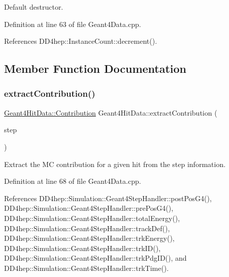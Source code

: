 Default destructor. 



Definition at line 63 of file Geant4\+Data.\+cpp.



References D\+D4hep\+::\+Instance\+Count\+::decrement().



\subsection{Member Function Documentation}
\hypertarget{class_d_d4hep_1_1_simulation_1_1_geant4_hit_data_aa05fcd729fd401c61e2fa7a48887efc5}{}\label{class_d_d4hep_1_1_simulation_1_1_geant4_hit_data_aa05fcd729fd401c61e2fa7a48887efc5} 
\subsubsection{\texorpdfstring{extract\+Contribution()}{extractContribution()}\hspace{0.1cm}{\footnotesize\ttfamily [1/2]}}
{\footnotesize\ttfamily \hyperlink{class_d_d4hep_1_1_simulation_1_1_geant4_hit_data_aec2f53237eac2db7d83dd03bca8719c5}{Geant4\+Hit\+Data\+::\+Contribution} Geant4\+Hit\+Data\+::extract\+Contribution (\begin{DoxyParamCaption}\item[{const G4\+Step $\ast$}]{step }\end{DoxyParamCaption})\hspace{0.3cm}{\ttfamily [static]}}



Extract the MC contribution for a given hit from the step information. 



Definition at line 68 of file Geant4\+Data.\+cpp.



References D\+D4hep\+::\+Simulation\+::\+Geant4\+Step\+Handler\+::post\+Pos\+G4(), D\+D4hep\+::\+Simulation\+::\+Geant4\+Step\+Handler\+::pre\+Pos\+G4(), D\+D4hep\+::\+Simulation\+::\+Geant4\+Step\+Handler\+::total\+Energy(), D\+D4hep\+::\+Simulation\+::\+Geant4\+Step\+Handler\+::track\+Def(), D\+D4hep\+::\+Simulation\+::\+Geant4\+Step\+Handler\+::trk\+Energy(), D\+D4hep\+::\+Simulation\+::\+Geant4\+Step\+Handler\+::trk\+I\+D(), D\+D4hep\+::\+Simulation\+::\+Geant4\+Step\+Handler\+::trk\+Pdg\+I\+D(), and D\+D4hep\+::\+Simulation\+::\+Geant4\+Step\+Handler\+::trk\+Time().

